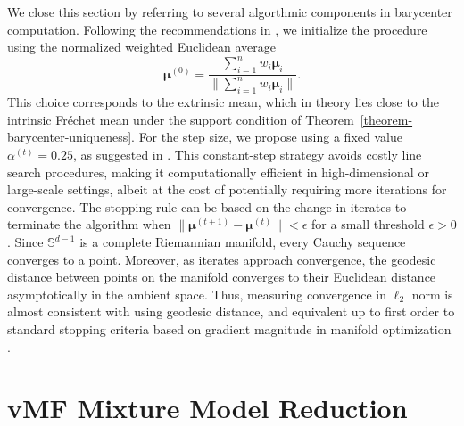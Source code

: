 \documentclass[10pt]{article}
\newcommand{\bfmu}{\boldsymbol{\mu}}
\newcommand{\bbS}{\mathbb{S}}
\newcommand{\Frechet}{Fr\'{e}chet }
\begin{document}
We close this section by referring to several algorthmic components in barycenter computation. Following the recommendations in \citet{you_2022_ParameterEstimationModelbased}, we initialize the procedure using the normalized weighted Euclidean average
\begin{equation*}
\bfmu^{(0)} = \frac{\sum_{i=1}^n w_i \bfmu_i}{\|\sum_{i=1}^n w_i \bfmu_i\|}.
\end{equation*}
This choice corresponds to the extrinsic mean, which in theory lies close to the intrinsic \Frechet mean under the support condition of Theorem~\ref{theorem-barycenter-uniqueness}. For the step size, we propose using a fixed value $\alpha^{(t)} = 0.25$, as suggested in \citep{hauberg_2018_DirectionalStatisticsSpherical}. This constant-step strategy avoids costly line search procedures, making it computationally efficient in high-dimensional or large-scale settings, albeit at the cost of potentially requiring more iterations for convergence. The stopping rule can be based on the change in iterates to terminate the algorithm when  $\| \bfmu^{(t+1)} - \bfmu^{(t)} \| < \epsilon$ for a small threshold $\epsilon > 0$. Since $\bbS^{d-1}$ is a complete Riemannian manifold, every Cauchy sequence converges to a point. Moreover, as iterates approach convergence, the geodesic distance between points on the manifold converges to their Euclidean distance asymptotically in the ambient space. Thus, measuring convergence in $\ell_2$ norm is almost consistent with using geodesic distance, and equivalent up to first order to standard stopping criteria based on gradient magnitude in manifold optimization \citep{boumal_2023_IntroductionOptimizationSmooth}.


\section{vMF Mixture Model Reduction}


\end{document}
